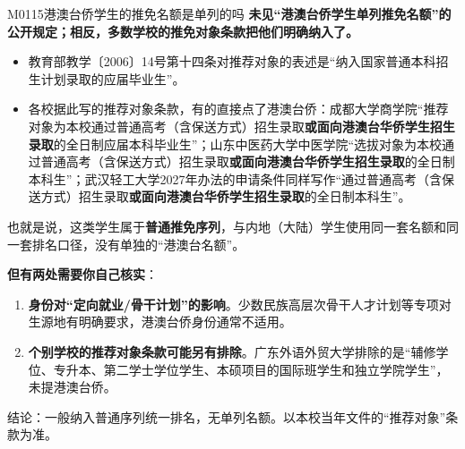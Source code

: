 \begin{qa}{M0115}{港澳台侨学生的推免名额是单列的吗}
\textbf{未见“港澳台侨学生单列推免名额”的公开规定；相反，多数学校的推免对象条款把他们明确纳入了。}

\begin{itemize}
  \item 教育部教学〔2006〕14号第十四条对推荐对象的表述是“纳入国家普通本科招生计划录取的应届毕业生”。
  \item 各校据此写的推荐对象条款，有的直接点了港澳台侨：成都大学商学院“推荐对象为本校通过普通高考（含保送方式）招生录取\textbf{或面向港澳台华侨学生招生录取}的全日制应届本科毕业生”；山东中医药大学中医学院“选拔对象为本校通过普通高考（含保送方式）招生录取\textbf{或面向港澳台华侨学生招生录取}的全日制本科生”；武汉轻工大学2027年办法的申请条件同样写作“通过普通高考（含保送方式）招生录取\textbf{或面向港澳台华侨学生招生录取}的全日制本科生”。
\end{itemize}

也就是说，这类学生属于\textbf{普通推免序列}，与内地（大陆）学生使用同一套名额和同一套排名口径，没有单独的“港澳台名额”。

\textbf{但有两处需要你自己核实}：
\begin{enumerate}
  \item \textbf{身份对“定向就业/骨干计划”的影响}。少数民族高层次骨干人才计划等专项对生源地有明确要求，港澳台侨身份通常不适用。
  \item \textbf{个别学校的推荐对象条款可能另有排除}。广东外语外贸大学排除的是“辅修学位、专升本、第二学士学位学生、本硕项目的国际班学生和独立学院学生”，未提港澳台侨。
\end{enumerate}

结论：一般纳入普通序列统一排名，无单列名额。以本校当年文件的“推荐对象”条款为准。
\end{qa}

